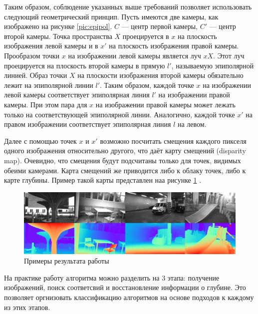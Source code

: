 Таким образом, соблюдение указанных выше требований позволяет использовать следующий геометрический принцип. Пусть имеются две камеры, как изображено 
на рисунке \ref{pic:epipol}. $C$ — центр первой камеры, $C'$ — центр второй камеры. Точка пространства $X$  
проецируется в $x$ на плоскость изображения левой камеры и в $x'$ на плоскость изображения правой камеры. Прообразом точки $x$ на изображении левой 
камеры является луч $xX$. Этот луч проецируется на плоскость второй камеры в прямую $l'$, называемую эпиполярной линией. Образ точки $X$ на плоскости 
изображения второй камеры обязательно лежит на эпиполярной линии $l'$.
Таким образом, каждой точке $x$ на изображении левой камеры соответствует эпиполярная линия $l'$ на изображении правой камеры. При этом пара для $x$ на 
изображении правой камеры может лежать только на соответствующей эпиполярной линии. Аналогично, каждой точке $x'$ на правом изображении соответствует 
эпиполярная линия $l$ на левом.

Далее с помощью точек $x$ и $x'$ возможно посчитать смещения каждого пикселя одного изображения относительно другого, что даёт карту смещений (disparity map). 
Очевидно, что смещения будут подсчитаны только для точек, видимых обеими камерами. Карта смещений же приводится либо к облаку точек, либо к карте глубины. Пример
такой карты представлен наа рисунке \ref{pic:depth} \cite{lipson2021raft}. 

\begin{figure}[H]
	\begin{center}
		\includegraphics[scale=0.7]{pics/exmpl.jpg}
		\caption{Примеры результата работы} 
		\label{pic:depth} %
	\end{center}
\end{figure}

На практике работу алгоритма можно разделить на 3 этапа: получение изображений, поиск соответсвий и восстановление информации о глубине. Это позволяет
оргнизовать классификацию алгоритмов на основе подходов к каждому из этих этапов. 





